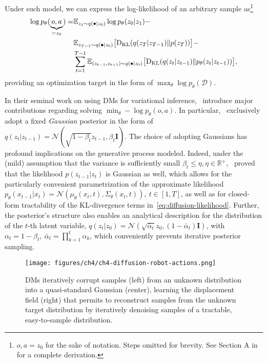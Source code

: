 Under such model, we can express the log-likelihood of an arbitrary sample as\footnote{\( o,a = z_0 \) for the sake of notation. Steps omitted for brevity. See Section A in~\citet{hoDenoisingDiffusionProbabilistic2020} for a complete derivation.
}
\begin{align}
    \log p_\theta (\underbrace{o,a}_{= z_0}) = 
    &\mathbb{E}_{z_1 \sim q(\bullet \vert z_0)} \log p_\theta (z_0 \vert z_1) - \label{eq:diffusion-likelihood} \\
    &\mathbb{E}_{z_{T-1} \sim q(\bullet \vert z_0)} \big[ \text{D}_{\text{KL}} (q(z_T \vert z_{T-1}) \Vert p(z_T) ) \big] - \notag \\ 
    &\sum_{t=1}^{T-1} \mathbb{E}_{(z_{t-1}, z_{t+1}) \sim q(\bullet \vert z_0)} \big[ \text{D}_{\text{KL}} (q(z_t \vert z_{t-1}) \Vert p_\theta(z_t \vert z_{t-1}) ) \big], \notag
\end{align}
providing an optimization target in the form of \( \max_\theta \log p_\theta (\mathcal D) \).

In their seminal work on using DMs for variational inference,~\citet{hoDenoisingDiffusionProbabilistic2020} introduce major contributions regarding solving \( \min_\theta -\log p_\theta(o,a) \).
In particular,~\citet{hoDenoisingDiffusionProbabilistic2020} exclusively adopt a fixed \emph{Gaussian} posterior in the form of \( q(z_t \vert z_{t-1}) = \mathcal{N}(\sqrt{1-\beta_t}z_{t-1}, \beta_t \mathbf I) \).
The choice of adopting Gaussians has profound implications on the generative process modeled. 
Indeed, under the (mild) assumption that the variance is sufficiently small \( \beta_t \leq \eta, \eta \in \mathbb R^+ \),~\citet{sohl-dicksteinDeepUnsupervisedLearning2015} proved that the likelihood \( p(z_{t-1} \vert z_t) \) is Gaussian as well, which allows for the particularly convenient parametrization of the approximate likelihood \( p_\theta (x_{t-1} \vert x_t) = \mathcal N(\mu_\theta(x_t, t), \Sigma_\theta(x_t,t)), \ t \in [1,T] \), as well as for closed-form tractability of the KL-divergence terms in~\ref{eq:diffusion-likelihood}.
Further, the posterior's structure also enables an analytical description for the distribution of the \( t\)-th latent variable, \( q(z_t \vert z_0) = \mathcal N (\sqrt{\bar{\alpha}_t}z_0, (1-\bar{\alpha}_t) \mathbf{I}) \), with \( \alpha_t = 1-\beta_t, \ \bar \alpha_t = \prod_{k=1}^t \alpha_k \), which conveniently prevents iterative posterior sampling.

\begin{figure}
    \centering
    \texttt{[image: figures/ch4/ch4-diffusion-robot-actions.png]}
    \caption{DMs iteratively corrupt samples (left) from an unknown distribution into a quasi-standard Gaussian (center), learning the displacement field (right) that permits to reconstruct samples from the unknown target distribution by iteratively denoising samples of a tractable, easy-to-sample distribution.}
    \label{fig:diffusion-robot-actions}
\end{figure}

